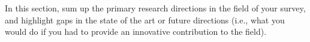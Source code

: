 In this section, sum up the primary research directions in the field of your survey, and highlight gaps in the state of the art or future directions (i.e., what you would do if you had to provide an innovative contribution to the field).
